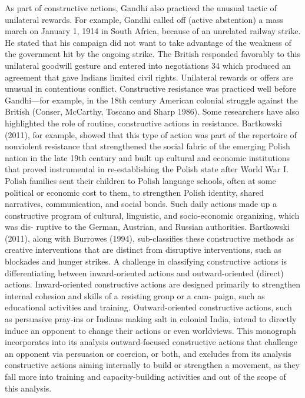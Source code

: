 \documentclass[twoside,a4paper,12pt,fleqn,openany]{extbook}
\begin{document}
As part of constructive actions, Gandhi also practiced the unusual tactic of unilateral
rewards. For example, Gandhi called off (active abstention) a mass march on January 1, 1914
in South Africa, because of an unrelated railway strike. He stated that his campaign did not
want to take advantage of the weakness of the government hit by the ongoing strike. The
British responded favorably to this unilateral goodwill gesture and entered into negotiations
34
which produced an agreement that gave Indians limited civil rights. Unilateral rewards or
offers are unusual in contentious conflict.
Constructive resistance was practiced well before Gandhi—for example, in the 18th century
American colonial struggle against the British (Conser, McCarthy, Toscano and Sharp 1986).
Some researchers have also highlighted the role of routine, constructive actions in resistance.
Bartkowski (2011), for example, showed that this type of action was part of the repertoire of
nonviolent resistance that strengthened the social fabric of the emerging Polish nation in the
late 19th century and built up cultural and economic institutions that proved instrumental in
re-establishing the Polish state after World War I. Polish families sent their children to Polish
language schools, often at some political or economic cost to them, to strengthen Polish
identity, shared narratives, communication, and social bonds. Such daily actions made up a
constructive program of cultural, linguistic, and socio-economic organizing, which was dis-
ruptive to the German, Austrian, and Russian authorities. Bartkowski (2011), along with
Burrowes (1994), sub-classifies these constructive methods as creative interventions that are
distinct from disruptive interventions, such as blockades and hunger strikes.
A challenge in classifying constructive actions is differentiating between inward-oriented
actions and outward-oriented (direct) actions. Inward-oriented constructive actions are
designed primarily to strengthen internal cohesion and skills of a resisting group or a cam-
paign, such as educational activities and training. Outward-oriented constructive actions,
such as persuasive pray-ins or Indians making salt in colonial India, intend to directly induce
an opponent to change their actions or even worldviews.
This monograph incorporates into its analysis outward-focused constructive actions that
challenge an opponent via persuasion or coercion, or both, and excludes from its analysis
constructive actions aiming internally to build or strengthen a movement, as they fall more
into training and capacity-building activities and out of the scope of this analysis.
\end{document}
